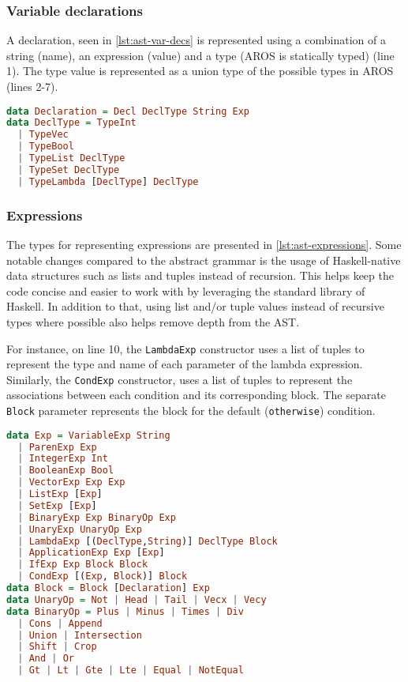 \subsubsection{Variable declarations}
A declaration, seen in \cref{lst:ast-var-decs} is represented using a combination of a string (name), an expression (value) and a type (AROS is statically typed) (line 1). The type value is represented as a union type of the possible types in AROS (lines 2-7). 
\begin{lstlisting}[language=haskell, float=htb,
caption={\lstinline{Declaration} and \lstinline{DeclType} data types (AST)},
label=lst:ast-var-decs]
data Declaration = Decl DeclType String Exp
data DeclType = TypeInt
  | TypeVec
  | TypeBool
  | TypeList DeclType
  | TypeSet DeclType
  | TypeLambda [DeclType] DeclType
\end{lstlisting}
\subsubsection{Expressions}
The types for representing expressions are presented in \cref{lst:ast-expressions}. Some notable changes compared to the abstract grammar is the usage of Haskell-native data structures such as lists and tuples instead of recursion. This helps keep the code concise and easier to work with by leveraging the standard library of Haskell. In addition to that, using list and/or tuple values instead of recursive types where possible also helps remove depth from the AST. 
\par For instance, on line 10, the \lstinline{LambdaExp} constructor uses a list of tuples to represent the type and name of each parameter of the lambda expression. Similarly, the \lstinline{CondExp} constructor, uses a list of tuples to represent the associations between each condition and its corresponding block. The separate \lstinline{Block} parameter represents the block for the default (\lstinline{otherwise}) condition.
\begin{lstlisting}[language=haskell, float=htb,
caption={\lstinline{Exp}, \lstinline{Block}, \lstinline{UnaryOp} and \lstinline{BinaryOp} data types (AST)},
label=lst:ast-expressions]
data Exp = VariableExp String
  | ParenExp Exp
  | IntegerExp Int
  | BooleanExp Bool
  | VectorExp Exp Exp
  | ListExp [Exp]
  | SetExp [Exp]
  | BinaryExp Exp BinaryOp Exp
  | UnaryExp UnaryOp Exp
  | LambdaExp [(DeclType,String)] DeclType Block
  | ApplicationExp Exp [Exp]
  | IfExp Exp Block Block
  | CondExp [(Exp, Block)] Block
data Block = Block [Declaration] Exp
data UnaryOp = Not | Head | Tail | Vecx | Vecy
data BinaryOp = Plus | Minus | Times | Div
  | Cons | Append
  | Union | Intersection
  | Shift | Crop
  | And | Or
  | Gt | Lt | Gte | Lte | Equal | NotEqual
\end{lstlisting}

